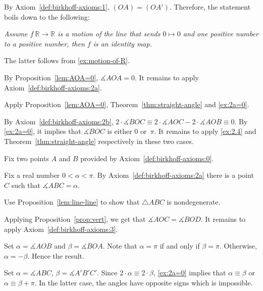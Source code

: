 \parbf{\ref{ex:[OA)=[OA')}.}
By Axiom~\ref{def:birkhoff-axioms:1},
$(OA)=(OA')$.
Therefore, the statement boils down to the following:

\textit{Assume $f\:\mathbb{R}\to \mathbb{R}$ is a motion of the line that sends $0\mapsto 0$ and one positive number to a positive number, then $f$ is an identity map.}

The latter follows from \ref{ex:motion-of-R}.

By Proposition~\ref{lem:AOA=0},
$\measuredangle AOA=0$.
It remains to apply Axiom~\ref{def:birkhoff-axioms:2a}.

Apply Proposition~\ref{lem:AOA=0},
Theorem~\ref{thm:straight-angle} 
and \ref{ex:2a=0}.

By Axiom~\ref{def:birkhoff-axioms:2b},
$2\cdot\measuredangle BOC
\equiv 
2\cdot\measuredangle AOC-2\cdot \measuredangle AOB
\equiv 0$.
By \ref{ex:2a=0}, 
it implies that 
$\measuredangle BOC$ is either $0$ or~$\pi$.
It remains to apply \ref{ex:2.4} and Theorem~\ref{thm:straight-angle} respectively in these two cases.

Fix two points $A$ and $B$ provided by Axiom~\ref{def:birkhoff-axioms:0}.

Fix a real number $0<\alpha<\pi$.
By Axiom~\ref{def:birkhoff-axioms:2a} there is a point $C$ such that $\measuredangle ABC=\alpha$.

Use Proposition~\ref{lem:line-line} to show that $\triangle ABC$ is nondegenerate.

Applying Proposition~\ref{prop:vert}, we get that
$\measuredangle AOC= \measuredangle BOD$.
It remains to apply Axiom~\ref{def:birkhoff-axioms:3}.

\setcounter{eqtn}{0}

Set $\alpha=\measuredangle AOB$ 
and 
$\beta=\measuredangle BOA$.
Note that $\alpha=\pi$ if and only if $\beta=\pi$.
Otherwise, $\alpha=-\beta$.
Hence the result.

Set $\alpha=\measuredangle ABC$, $\beta=\measuredangle A'B'C'$.
Since $2\cdot\alpha\equiv 2\cdot \beta$, \ref{ex:2a=0} implies that
 $\alpha\equiv \beta$ or $\alpha\equiv \beta+\pi$.
In the latter case, the angles have opposite signs which is impossible.

